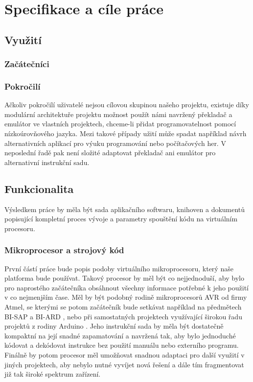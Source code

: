 \chapter{Specifikace a cíle práce}

\blind[1]

\section{Využití}

\blind[1]

\subsection{Začátečníci}

\blind[2]

\subsection{Pokročilí}

Ačkoliv pokročilí uživatelé nejsou cílovou skupinou našeho projektu, existuje díky modulární architektuře projektu možnost použít námi navržený překladač a emulátor ve vlastních projektech, chceme-li přidat programovatelnost pomocí nízkoúrovňového jazyka. Mezi takové případy užití může spadat například návrh alternativních aplikací pro výuku programování nebo počítačových her. V neposlední řadě pak není složité adaptovat překladač ani emulátor pro alternativní instrukční sadu.

\section{Funkcionalita}

Výsledkem práce by měla být sada aplikačního softwaru, knihoven a dokumentů popisující kompletní proces vývoje a parametry spouštění kódu na virtuálním procesoru.

\subsection{Mikroprocesor a strojový kód}

První částí práce bude popis podoby virtuálního mikroprocesoru, který naše platforma bude používat. Takový procesor by měl být co nejjednoduší, aby bylo pro naprostého začátečníka obsáhnout všechny informace potřebné k jeho použití v co nejmenjším čase. Měl by být podobný rodině mikroprocesorů AVR od firmy Atmel, se kterými se potom začátečník bude setkávat například na předmětech BI-SAP a BI-ARD , nebo při samostatných projektech využívající širokou řadu projektů z rodiny Arduino . Jeho instrukční sada by měla být dostatečně kompaktní na její snadné zapamatování a navržená tak, aby bylo jednoduché kódovat a dekódovat instrukce bez použití manuálu nebo externího programu. Finálně by potom procesor měl umožňovat snadnou adaptaci pro další využití v jiných projektech, aby nebylo nutné vyvíjet nová řešení a dále tím fragmentovat již tak široké spektrum zařízení.

